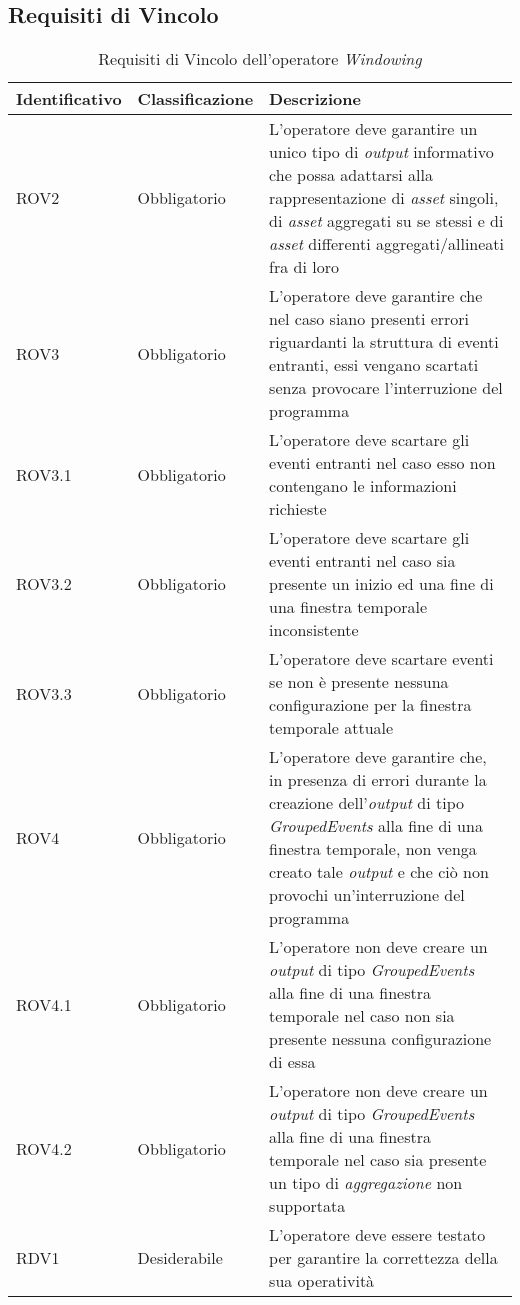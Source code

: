 \subsection{Requisiti di Vincolo}
{
\centering
\begin{longtable}{L{3cm} L{3cm} L{7.5cm}}
\caption{Requisiti di Vincolo dell'operatore \textit{Windowing}}\\
\textbf{Identificativo} &
\textbf{Classificazione}&
\textbf{Descrizione}\\
\endhead
\hline
ROV2 & Obbligatorio & L'operatore deve garantire un unico tipo di \textit{output} informativo che possa adattarsi alla rappresentazione di \textit{asset} singoli, di \textit{asset} aggregati su se stessi e di \textit{asset} differenti aggregati/allineati fra di loro \\
\hline
ROV3 & Obbligatorio & L'operatore deve garantire che nel caso siano presenti errori riguardanti la struttura di eventi entranti, essi vengano scartati senza provocare l'interruzione del programma\\
\hline
ROV3.1 & Obbligatorio & L'operatore deve scartare gli eventi entranti nel caso esso non contengano le informazioni richieste\\
\hline
ROV3.2 & Obbligatorio & L'operatore deve scartare gli eventi entranti nel caso sia presente un inizio ed una fine di una finestra temporale inconsistente\\
\hline
ROV3.3 & Obbligatorio & L'operatore deve scartare eventi se non è presente nessuna configurazione per la finestra temporale attuale\\
\hline
ROV4 & Obbligatorio & L'operatore deve garantire che, in presenza di errori durante la creazione dell'\textit{output} di tipo \textit{GroupedEvents} alla fine di una finestra temporale, non venga creato tale \textit{output} e che ciò non provochi un'interruzione del programma\\
\hline
ROV4.1 & Obbligatorio & L'operatore non deve creare un \textit{output} di tipo \textit{GroupedEvents} alla fine di una finestra temporale nel caso non sia presente nessuna configurazione di essa\\
\hline
ROV4.2 & Obbligatorio & L'operatore non deve creare un \textit{output} di tipo \textit{GroupedEvents} alla fine di una finestra temporale nel caso sia presente un tipo di \textit{aggregazione} non supportata\\
\hline
RDV1 & Desiderabile & L'operatore deve essere testato per garantire la correttezza della sua operatività\\
\hline
\end{longtable}
}



